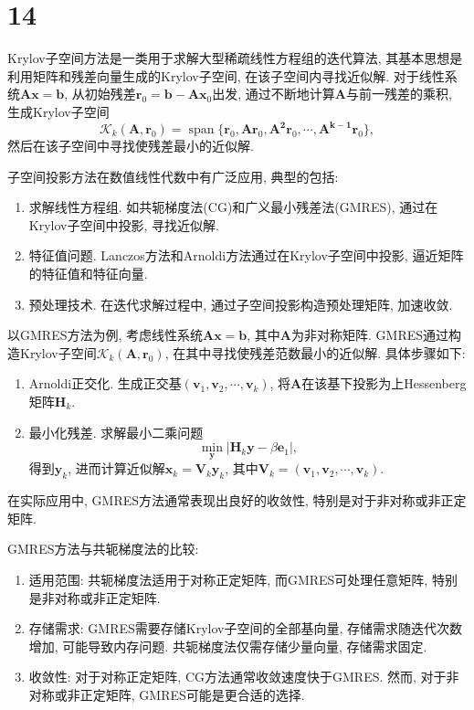 \section*{14}

Krylov子空间方法是一类用于求解大型稀疏线性方程组的迭代算法, 其基本思想是利用矩阵和残差向量生成的Krylov子空间, 在该子空间内寻找近似解.
对于线性系统$\bm{Ax}=\bm{b}$, 从初始残差$\bm{r}_0=\bm{b}-\bm{Ax}_0$出发, 通过不断地计算$\bm{A}$与前一残差的乘积, 生成Krylov子空间
\begin{equation*}
    \mathcal{K}_k(\bm{A},\bm{r}_0)=\mathop{\mathrm{span}}\{\bm{r}_0,\bm{Ar}_0,\bm{A^2r}_0,\cdots,\bm{A^{k-1}r}_0\},
\end{equation*}
然后在该子空间中寻找使残差最小的近似解.

子空间投影方法在数值线性代数中有广泛应用, 典型的包括:
\begin{enumerate}
    \item 求解线性方程组.
        如共轭梯度法(CG)和广义最小残差法(GMRES), 通过在Krylov子空间中投影, 寻找近似解.

    \item 特征值问题.
        Lanczos方法和Arnoldi方法通过在Krylov子空间中投影, 逼近矩阵的特征值和特征向量.

    \item 预处理技术.
        ​在迭代求解过程中, 通过子空间投影构造预处理矩阵, 加速收敛.
\end{enumerate}

以GMRES方法为例, 考虑线性系统$\bm{Ax}=\bm{b}$, 其中$\bm{A}$为非对称矩阵.
GMRES通过构造Krylov子空间$\mathcal{K}_k(\bm{A},\bm{r}_0)$, 在其中寻找使残差范数最小的近似解.
​具体步骤如下:
\begin{enumerate}
    \item Arnoldi正交化.
        生成正交基$(\bm{v}_1, \bm{v}_2, \cdots, \bm{v}_k)$, 将$\bm{A}$在该基下投影为上Hessenberg矩阵$\bm{H}_k$.

    \item 最小化残差.
        求解最小二乘问题
        \begin{equation*}
            \min_{\bm{y}} |\bm{H}_k\bm{y}-\beta\bm{e}_1|,
        \end{equation*}
        得到$\bm{y}_k$, 进而计算近似解$\bm{x}_k=\bm{V}_k\bm{y}_k$, 其中$\bm{V}_k=(\bm{v}_1, \bm{v}_2, \cdots, \bm{v}_k)$.
\end{enumerate}
在实际应用中, GMRES方法通常表现出良好的收敛性, 特别是对于非对称或非正定矩阵.

GMRES方法与共轭梯度法的比较:
\begin{enumerate}
    \item 适用范围:
        共轭梯度法适用于对称正定矩阵, 而GMRES可处理任意矩阵, 特别是非对称或非正定矩阵.

    \item 存储需求:
        GMRES需要存储Krylov子空间的全部基向量, 存储需求随迭代次数增加, 可能导致内存问题.
        共轭梯度法仅需存储少量向量, 存储需求固定.

    \item 收敛性:
        对于对称正定矩阵, CG方法通常收敛速度快于GMRES.
        然而, 对于非对称或非正定矩阵, GMRES可能是更合适的选择.
\end{enumerate}
